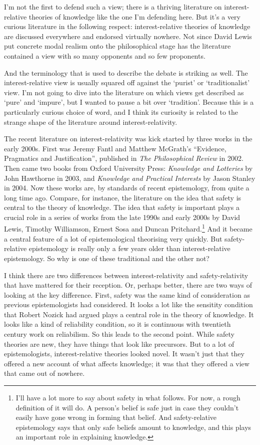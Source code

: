 \documentclass[
  11pt,
]{book}
\begin{document}
I'm not the first to defend such a view; there is a thriving literature on interest-relative theories of knowledge like the one I'm defending here. But it's a very curious literature in the following respect: interest-relative theories of knowledge are discussed everywhere and endorsed virtually nowhere. Not since David Lewis \citeyearpar{Lewis1986a} put concrete modal realism onto the philosophical stage has the literature contained a view with so many opponents and so few proponents.

And the terminology that is used to describe the debate is striking as well. The interest-relative view is usually squared off against the `purist' or `traditionalist' view. I'm not going to dive into the literature on which views get described as `pure' and `impure', but I wanted to pause a bit over `tradition'. Because this is a particularly curious choice of word, and I think its curiosity is related to the strange shape of the literature around interest-relativity.

The recent literature on interest-relativity was kick started by three works in the early 2000s. First was Jeremy Fantl and Matthew McGrath's ``Evidence, Pragmatics and Justification'', published in \emph{The Philosophical Review} in 2002. Then came two books from Oxford University Press: \emph{Knowledge and Lotteries} by John Hawthorne in 2003, and \emph{Knowledge and Practical Interests} by Jason Stanley in 2004. Now these works are, by standards of recent epistemology, from quite a long time ago. Compare, for instance, the literature on the idea that safety is central to the theory of knowledge. The idea that safety is important plays a crucial role in a series of works from the late 1990s and early 2000s by David Lewis, Timothy Williamson, Ernest Sosa and Duncan Pritchard.\footnote{I'll have a lot more to say about safety in what follows. For now, a rough definition of it will do. A person's belief is safe just in case they couldn't easily have gone wrong in forming that belief. And safety-relative epistemology says that only safe beliefs amount to knowledge, and this plays an important role in explaining knowledge.} And it became a central feature of a lot of epistemological theorising very quickly. But safety-relative epistemology is really only a few years older than interest-relative epistemology. So why is one of these traditional and the other not?

I think there are two differences between interest-relativity and safety-relativity that have mattered for their reception. Or, perhaps better, there are two ways of looking at the key difference. First, safety was the same kind of consideration as previous epistemologists had considered. It looks a lot like the sensitity condition that Robert Nozick \citeyearpar{Nozick1981} had argued plays a central role in the theory of knowledge. It looks like a kind of reliability condition, so it is continuous with twentieth century work on reliabilism. So this leads to the second point. While safety theories are new, they have things that look like precursors. But to a lot of epistemologists, interest-relative theories looked novel. It wasn't just that they offered a new account of what affects knowledge; it was that they offered a view that came out of nowhere.
\end{document}

